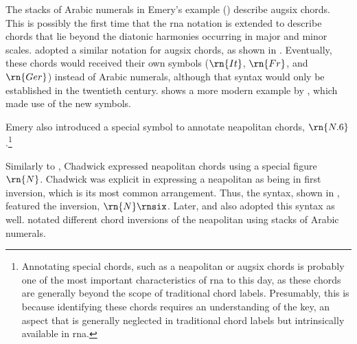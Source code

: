 


The stacks of Arabic numerals in Emery's example
() describe
\gls{augsix} chords. This is possibly the first time that
the \gls{rna} notation is extended to describe chords that
lie beyond the diatonic harmonies occurring in major and
minor scales. \textcite{shepard1896harmony} adopted a
similar notation for \gls{augsix} chords, as shown in
. Eventually,
these chords would received their own symbols ($\rn{It}$,
$\rn{Fr}$, and $\rn{Ger}$) instead of Arabic numerals,
although that syntax would only be established in the
twentieth century.
 shows a more
modern example by \textcite{goldman1965harmony}, which
made use of the new symbols.



Emery also introduced a special symbol to annotate
\gls{neapolitan} chords, $\rn{N.6}$.\footnote{Annotating
special chords, such as a \gls{neapolitan} or \gls{augsix}
chords is probably one of the most important characteristics
of \gls{rna} to this day, as these chords are generally
beyond the scope of traditional chord labels. Presumably,
this is because identifying these chords requires an
understanding of the key, an aspect that is generally
neglected in traditional chord labels but intrinsically
available in \gls{rna}.}

Similarly to \textcite{emery1879elements}, Chadwick
expressed \gls{neapolitan} chords using a special figure
$\rn{N}$. Chadwick was explicit in expressing a
\gls{neapolitan} as being in first inversion, which is its
most common arrangement. Thus, the syntax, shown in
, featured
the inversion, $\rn{N}\rnsix$. Later,
\textcite{heacox1907lessons} and
\textcite{alchin1921applied} also adopted this syntax as
well. \textcite{heacox1907lessons} notated different chord
inversions of the \gls{neapolitan} using stacks of Arabic
numerals.

